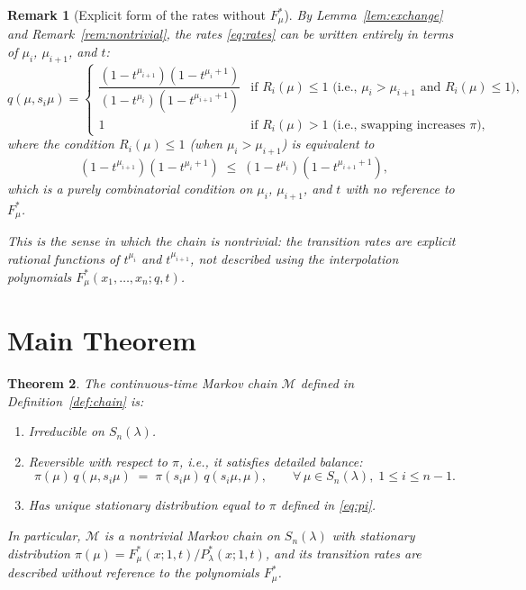\documentclass[12pt]{article}
\newtheorem{theorem}{Theorem}
\newtheorem{remark}[theorem]{Remark}
\begin{document}
\begin{remark}[Explicit form of the rates without $F^*_\mu$]
By Lemma~\ref{lem:exchange} and Remark~\ref{rem:nontrivial}, the rates \eqref{eq:rates} can be written entirely in terms of $\mu_i$, $\mu_{i+1}$, and $t$:
\begin{equation}\label{eq:explicit-rates}
q(\mu, s_i\mu) = \begin{cases}
\dfrac{(1-t^{\mu_{i+1}})(1-t^{\mu_i+1})}{(1-t^{\mu_i})(1-t^{\mu_{i+1}+1})} & \text{if } R_i(\mu) \leq 1 \text{ (i.e., } \mu_i > \mu_{i+1} \text{ and } R_i(\mu) \leq 1\text{)},\\[6pt]
1 & \text{if } R_i(\mu) > 1 \text{ (i.e., swapping increases } \pi\text{)},
\end{cases}
\end{equation}
where the condition $R_i(\mu) \leq 1$ (when $\mu_i > \mu_{i+1}$) is equivalent to
\[
(1-t^{\mu_{i+1}})(1-t^{\mu_i+1}) \;\leq\; (1-t^{\mu_i})(1-t^{\mu_{i+1}+1}),
\]
which is a purely combinatorial condition on $\mu_i$, $\mu_{i+1}$, and $t$ with no reference to $F^*_\mu$.

This is the sense in which the chain is \emph{nontrivial}: the transition rates are explicit rational functions of $t^{\mu_i}$ and $t^{\mu_{i+1}}$, not described using the interpolation polynomials $F^*_\mu(x_1,\dots,x_n; q, t)$.
\end{remark}

\section{Main Theorem}

\begin{theorem}\label{thm:main}
The continuous-time Markov chain $\mathcal{M}$ defined in Definition~\ref{def:chain} is:
\begin{enumerate}[label=(\roman*)]
\item \emph{Irreducible} on $S_n(\lambda)$.
\item \emph{Reversible} with respect to $\pi$, i.e., it satisfies detailed balance:
\[
\pi(\mu)\, q(\mu, s_i\mu) \;=\; \pi(s_i\mu)\, q(s_i\mu, \mu), \qquad \forall\, \mu \in S_n(\lambda),\; 1 \leq i \leq n-1.
\]
\item Has \emph{unique stationary distribution} equal to $\pi$ defined in \eqref{eq:pi}.
\end{enumerate}
In particular, $\mathcal{M}$ is a nontrivial Markov chain on $S_n(\lambda)$ with stationary distribution $\pi(\mu) = F^*_\mu(x;1,t)/P^*_\lambda(x;1,t)$, and its transition rates are described without reference to the polynomials $F^*_\mu$.
\end{theorem}
\end{document}
